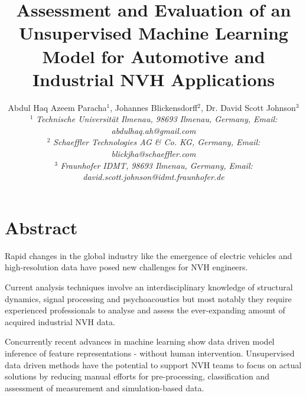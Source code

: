 \documentclass[a4paper, 10pt, twocolumn]{article}
\begin{document}
\date{}                                         %

\title{\vspace{-8mm}\textbf{\large
Assessment and Evaluation of an Unsupervised Machine Learning Model for Automotive and Industrial NVH Applications }}

\author{
Abdul Haq Azeem Paracha$^1$, Johannes Blickensdorff$^2$, Dr. David Scott Johnson$^3$ \\
$^1$ \emph{\small Technische Universität Ilmenau, 98693 Ilmenau,
Germany, Email: abdulhaq.ah@gmail.com
}\\
$^2$ \emph{\small Schaeffler Technologies AG \& Co. KG, Germany,
Email: blickjha@schaeffler.com 
}\\ 

$^3$ \emph{\small Fraunhofer IDMT, 98693 Ilmenau, Germany,
Email: david.scott.johnson@idmt.fraunhofer.de}

}
\maketitle
\thispagestyle{empty}           %


\section*{Abstract}
\label{sec:Abstract}
Rapid changes in the global industry like the emergence of electric vehicles and high-resolution data have posed new challenges for NVH engineers. 
\par
Current analysis techniques involve an interdisciplinary knowledge of structural dynamics, signal processing and psychoacoustics but most notably they require experienced professionals to analyse and assess the ever-expanding amount of acquired industrial NVH data. 
\par
Concurrently recent advances in machine learning show data driven model inference of feature representations - without human intervention. Unsupervised data driven methods have the potential to support NVH teams to focus on actual solutions by reducing manual eﬀorts for pre-processing, classiﬁcation and assessment of measurement and simulation-based data.
\end{document}
